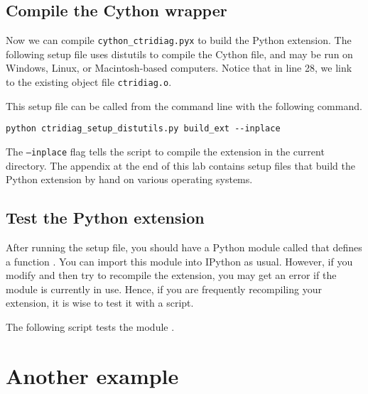 \subsection*{Compile the Cython wrapper}

Now we can compile \texttt{cython\_ctridiag.pyx} to build the Python extension.
The following setup file uses distutils to compile the Cython file, and may be run on Windows, Linux, or Macintosh-based computers.
Notice that in line 28, we link to the existing object file \texttt{ctridiag.o}.



This setup file can be called from the command line with the following command.
\begin{lstlisting}[style=ShellInput]
python ctridiag_setup_distutils.py build_ext --inplace
\end{lstlisting}
The \texttt{--inplace} flag tells the script to compile the extension in the current directory.
The appendix at the end of this lab contains setup files that build the Python extension by hand on various operating systems.





\subsection*{Test the Python extension}
After running the setup file, you should have a Python module called  that defines a function .
You can import this module into IPython as usual.
However, if you modify  and then try to recompile the extension, you may get an error if the module is currently in use.
Hence, if you are frequently recompiling your extension, it is wise to test it  with a script.

The following script tests the module .




\section*{Another example}


